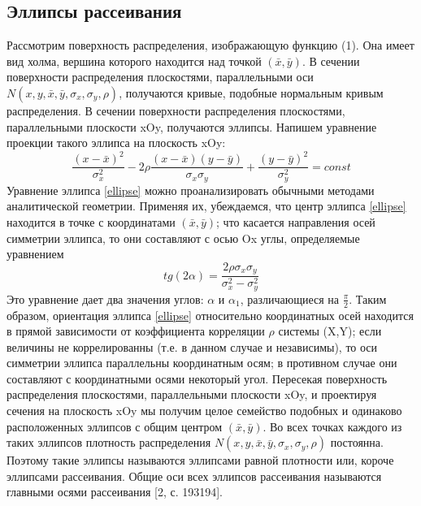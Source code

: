 \subsection{Эллипсы рассеивания}
Рассмотрим поверхность распределения, изображающую функцию (1). Она имеет вид холма, вершина которого находится над точкой $(\bar{x},\bar{y})$.
\newline
В сечении поверхности распределения плоскостями, параллельными оси $ N(x, y, \bar{x}, \bar{y}, \sigma_{x}, \sigma_{y}, \rho)$, получаются кривые, подобные нормальным кривым распределения. В сечении поверхности распределения плоскостями, параллельными плоскости xOy, получаются эллипсы. Напишем уравнение проекции такого эллипса на плоскость xOy: 
\begin{equation}
\frac{(x-\bar{x})^{2}}{\sigma_{x}^{2}} - 
2\rho\frac{(x-\bar{x})(y-\bar{y})}{\sigma_{x}\sigma_{y}}+
\frac{(y-\bar{y})^{2}}{\sigma_{y}^{2}} = const
\label{ellipse}
\end{equation}
Уравнение эллипса \ref{ellipse} можно проанализировать обычными методами аналитической геометрии. Применяя их, убеждаемся, что центр эллипса \ref{ellipse} находится в точке с координатами $(\bar{x},\bar{y})$; что касается направления осей симметрии эллипса, то они составляют с осью Ox углы, определяемые уравнением
\begin{equation}
tg(2\alpha) = \frac{2\rho\sigma_{x}\sigma_{y}}{\sigma_{x}^{2} - \sigma_{y}^{2}}
\label{angle}
\end{equation}
Это уравнение дает два значения углов: $\alpha$ и $\alpha_{1}$, различающиеся на $\frac{\pi}{2}$.
\newline
Таким образом, ориентация эллипса \ref{ellipse} относительно координатных осей находится в прямой зависимости от коэффициента корреляции $\rho$ системы (X,Y); если величины не коррелированны (т.е. в данном случае и независимы), то оси симметрии эллипса параллельны координатным осям; в противном случае они составляют с координатными осями некоторый угол.
\newline
Пересекая поверхность распределения плоскостями, параллельными плоскости xOy, и проектируя сечения на плоскость xOy мы получим целое семейство подобных и одинаково расположенных эллипсов с общим центром $(\bar{x},\bar{y})$. Во всех точках каждого из таких эллипсов плотность распределения $ N(x, y, \bar{x}, \bar{y}, \sigma_{x}, \sigma_{y}, \rho)$ постоянна. Поэтому такие эллипсы называются эллипсами равной плотности или, короче эллипсами рассеивания. Общие оси всех эллипсов рассеивания называются главными осями рассеивания [2, с. 193194].